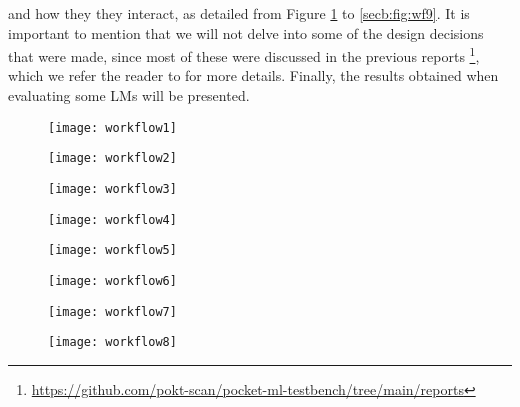 and how they they interact, as detailed from Figure \ref{secb:fig:wf1} to \ref{secb:fig:wf9}. 
It is important to mention that we will not delve into some of the design decisions that were made, since most of these were discussed in the previous reports \footnote{\url{https://github.com/pokt-scan/pocket-ml-testbench/tree/main/reports}}, which we refer the reader to for more details. 
Finally, the results obtained when evaluating some \glspl{LM} will be presented.  

\begin{figure}[H]
    \centering        
    \texttt{[image: workflow1]}
    \caption{}
    \label{secb:fig:wf1}
\end{figure}

\begin{figure}[H]
    \centering        
    \texttt{[image: workflow2]}
    \caption{}
    \label{secb:fig:wf2}
\end{figure}

\begin{figure}[H]
    \centering        
    \texttt{[image: workflow3]}
    \caption{}
    \label{secb:fig:wf3}
\end{figure}

\begin{figure}[H]
    \centering        
    \texttt{[image: workflow4]}
    \caption{}
    \label{secb:fig:wf4}
\end{figure}

\begin{figure}[H]
    \centering
    \texttt{[image: workflow5]}
    \caption{}
    \label{secb:fig:wf5}
\end{figure}

\begin{figure}[H]
    \centering
    \texttt{[image: workflow6]}
    \caption{}
    \label{secb:fig:wf6}
\end{figure}

\begin{figure}[H]
    \centering
    \texttt{[image: workflow7]}
    \caption{}
    \label{secb:fig:wf7}
\end{figure}

\begin{figure}[H]
    \centering
    \texttt{[image: workflow8]}
    \caption{}
    \label{secb:fig:wf8}
\end{figure}

